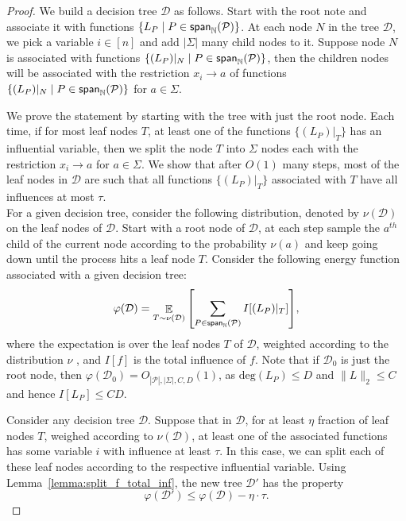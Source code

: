 \documentclass[11pt]{article}
\newcommand\Expect[2]{{\mathop{\mathbb{E}}_{#1}\left[ {#2} \right]}}
\newcommand\spn{{\sf span}_{\mathbb{N}}}
\renewcommand\leq{\leqslant}
\begin{document}
\jones*
\begin{proof}
We build a decision tree $\mathcal{D}$ as follows. Start with the root note and associate it with functions $\{L_P\mid P\in \spn(\mathcal{P})\}$. At each node $N$ in the tree $\mathcal{D}$, we pick a variable $i\in [n]$ and add $|\Sigma|$ many child nodes to it. Suppose node $N$ is associated with functions $\{(L_P)|_{N} \mid P\in \spn(\mathcal{P})\}$, then the children nodes will be associated with the restriction $x_i \rightarrow a$ of functions $\{(L_P)|_{N} \mid P\in \spn(\mathcal{P})\}$ for $a\in \Sigma$.

    
    

    We prove the statement by starting with the tree with just the root node. Each time, if for most leaf nodes $T$, at least one of the functions $\{(L_P)|_T\}$ has an influential variable, then we split the node $T$ into $\Sigma$ nodes each with the restriction $x_i \rightarrow a$ for $a\in \Sigma$. We show that after $O(1)$ many steps, most of the leaf nodes in $\mathcal{D}$ are such that all functions $\{(L_P)|_T\}$ associated with $T$ have all influences at most $\tau$. \\

 
 For a given decision tree, consider the following distribution, denoted by $\nu(\mathcal{D})$ on the leaf nodes of $\mathcal{D}$. Start with a root node of $\mathcal{D}$, at each step sample the $a^{th}$ child of the current node according to the probability $\nu(a)$ and keep going down until the process hits a leaf node $T$. Consider the following energy function associated with a given decision tree:
    $$\varphi(\mathcal{D}) = \Expect{T\sim \nu(\mathcal{D})}{\sum_{P\in \spn(\mathcal{P})} I[(L_P)|_{T}]},$$
    where the expectation is over the leaf nodes $T$ of $\mathcal{D}$, weighted according to the distribution $\nu$ , and $I[f]$ is the total influence of $f$. Note that if $\mathcal{D}_0$ is just the root node, then $\varphi(\mathcal{D}_0) = O_{|\mathcal{P}|, |\Sigma|, C, D}(1)$, as $\mathrm{deg}(L_P)\leq D$ and $\|L\|_2\leq C$ and hence $I[L_P] \leq CD$. 
    
    
    Consider any decision tree $\mathcal{D}$. Suppose that in $\mathcal{D}$, for at least $\eta$ fraction of leaf nodes $T$, weighed according to $\nu(\mathcal{D})$, at least one of the associated functions has some variable $i$ with influence at least $\tau$. In this case, we can split each of these leaf nodes according to the respective influential variable. Using Lemma~\ref{lemma:split_f_total_inf}, the new tree $\mathcal{D}'$ has the property
    $$ \varphi(\mathcal{D}') \leq \varphi(\mathcal{D}) - \eta\cdot \tau.$$


\end{proof}
\end{document}
